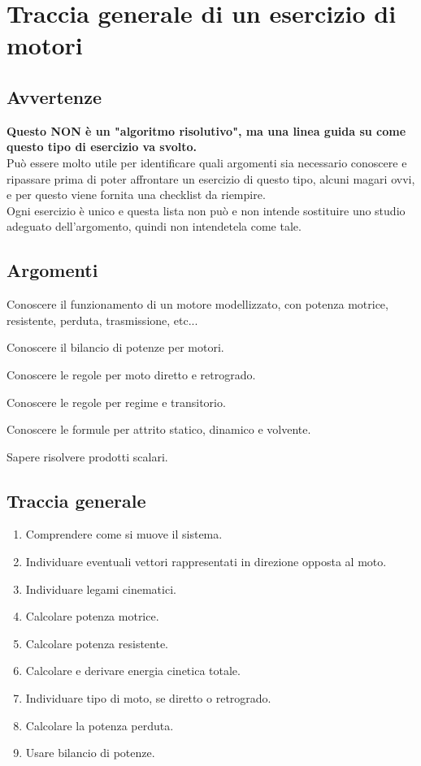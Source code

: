 \documentclass[main.tex]{subfiles}
\begin{document}
\section{Traccia generale di un esercizio di motori}

\subsection{Avvertenze}
\textbf{Questo NON è un "algoritmo risolutivo", ma una linea guida su come questo tipo di esercizio va svolto.}
\\
Può essere molto utile per identificare quali argomenti sia necessario conoscere e ripassare prima di poter affrontare un esercizio di questo tipo, alcuni magari ovvi, e per questo viene fornita una checklist da riempire.
\\
Ogni esercizio è unico e questa lista non può e non intende sostituire uno studio adeguato dell'argomento, quindi non intendetela come tale.

\subsection{Argomenti}
\begin{todolist}
\item Conoscere il funzionamento di un motore modellizzato, con potenza motrice, resistente, perduta, trasmissione, etc...
\item Conoscere il bilancio di potenze per motori.
\item Conoscere le regole per moto diretto e retrogrado.
\item Conoscere le regole per regime e transitorio.
\item Conoscere le formule per attrito statico, dinamico e volvente.
\item Sapere risolvere prodotti scalari.
\end{todolist}

\subsection{Traccia generale}
\begin{enumerate}
\item Comprendere come si muove il sistema.
\item Individuare eventuali vettori rappresentati in direzione opposta al moto.
\item Individuare legami cinematici.
\item Calcolare potenza motrice.
\item Calcolare potenza resistente.
\item Calcolare e derivare energia cinetica totale.
\item Individuare tipo di moto, se diretto o retrogrado.
\item Calcolare la potenza perduta.
\item Usare bilancio di potenze.
\end{enumerate}
\end{document}

